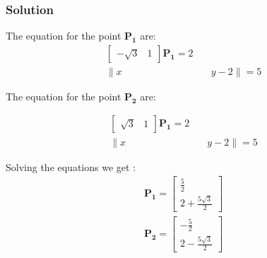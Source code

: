 \documentclass{beamer}
\begin{document}
\begin{frame}
\frametitle{Solution}
The equation for the point $\mathbf{P_1}$ are:
\begin{align}
\begin{bmatrix}-\sqrt{3} & 1\end{bmatrix}\mathbf{P_1} = 2\\
\lVert x &\quad y-2 \rVert = 5
\end{align}

The equation for the point $\mathbf{P_2}$ are:

\begin{align}
\begin{bmatrix}\sqrt{3} & 1\end{bmatrix}\mathbf{P_1} = 2\\
\lVert x &\quad y-2 \rVert = 5
\end{align}

Solving the equations we get :
\begin{align}
   \mathbf{P_1} = \begin{bmatrix}\frac{5}{2} \\ 2+\frac{5\sqrt{3}}{2}\end{bmatrix} \\
    \mathbf{P_2} = \begin{bmatrix}-\frac{5}{2} \\ 2-\frac{5\sqrt{3}}{2}\end{bmatrix}
\end{align}
\end{frame}
\end{document}
